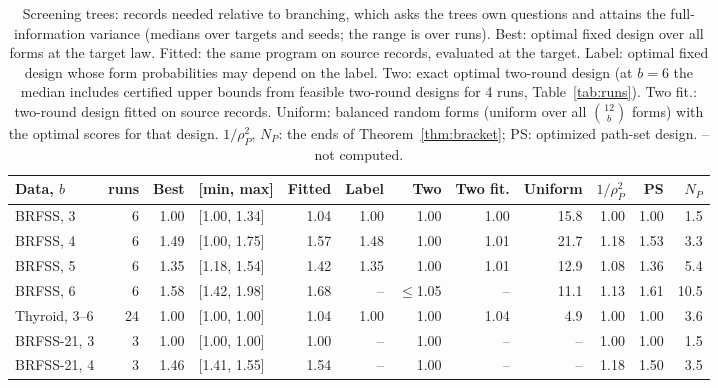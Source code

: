 \begin{table}[t]
\centering
\caption{Screening trees: records needed relative to branching, which asks the tree\textquotesingle s own questions and attains the full-information variance (medians over targets and seeds; the range is over runs). Best: optimal fixed design over all forms at the target law. Fitted: the same program on source records, evaluated at the target. Label: optimal fixed design whose form probabilities may depend on the label. Two: exact optimal two-round design (at $b=6$ the median includes certified upper bounds from feasible two-round designs for 4 runs, Table~\ref{tab:runs}). Two fit.: two-round design fitted on source records. Uniform: balanced random forms (uniform over all $\binom{12}b$ forms) with the optimal scores for that design. $1/\rho_P^2$, $N_P$: the ends of Theorem~\ref{thm:bracket}; PS: optimized path-set design. -- not computed.}
\label{tab:screening}
\footnotesize
\setlength{\tabcolsep}{5pt}
\begin{tabular}{lrrlrrrrrrrr}
\toprule
Data, $b$ & runs & Best & [min, max] & Fitted & Label & Two & Two fit. & Uniform & $1/\rho_P^2$ & PS & $N_P$ \\
\midrule
BRFSS, 3 & 6 & 1.00 & [1.00, 1.34] & 1.04 & 1.00 & 1.00 & 1.00 & 15.8 & 1.00 & 1.00 & 1.5 \\
BRFSS, 4 & 6 & 1.49 & [1.00, 1.75] & 1.57 & 1.48 & 1.00 & 1.01 & 21.7 & 1.18 & 1.53 & 3.3 \\
BRFSS, 5 & 6 & 1.35 & [1.18, 1.54] & 1.42 & 1.35 & 1.00 & 1.01 & 12.9 & 1.08 & 1.36 & 5.4 \\
BRFSS, 6 & 6 & 1.58 & [1.42, 1.98] & 1.68 & -- & $\le$1.05 & -- & 11.1 & 1.13 & 1.61 & 10.5 \\
Thyroid, 3--6 & 24 & 1.00 & [1.00, 1.00] & 1.04 & 1.00 & 1.00 & 1.04 & 4.9 & 1.00 & 1.00 & 3.6 \\
\addlinespace[2pt]
BRFSS-21, 3 & 3 & 1.00 & [1.00, 1.00] & 1.00 & -- & 1.00 & -- & -- & 1.00 & 1.00 & 1.5 \\
BRFSS-21, 4 & 3 & 1.46 & [1.41, 1.55] & 1.54 & -- & 1.00 & -- & -- & 1.18 & 1.50 & 3.5 \\
\bottomrule
\end{tabular}
\end{table}

